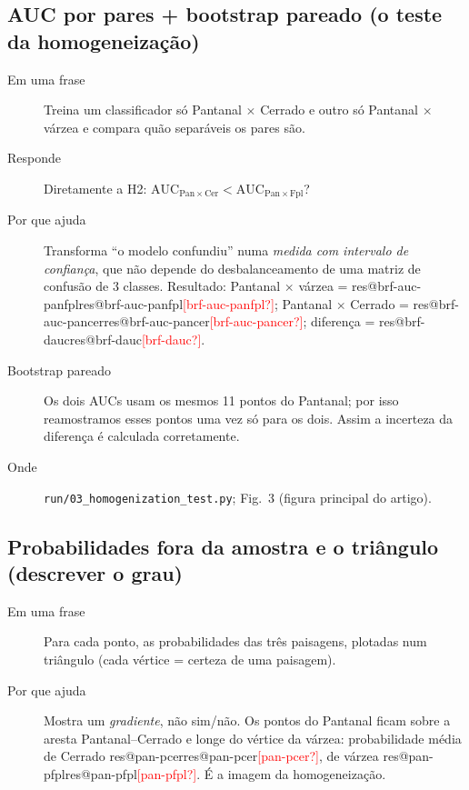 \documentclass[11pt,a4paper]{article}
\makeatletter
\newcommand{\res}[1]{\ifcsname res@#1\endcsname\csname res@#1\endcsname\else\textcolor{red}{[#1?]}\fi}
\makeatother
\begin{document}
\subsection{AUC por pares + bootstrap pareado (o teste da homogeneização)}
\begin{description}
\item[Em uma frase] Treina um classificador só Pantanal $\times$ Cerrado e outro só Pantanal
$\times$ várzea e compara quão separáveis os pares são.
\item[Responde] Diretamente a H2: $\mathrm{AUC}_{\mathrm{Pan}\times\mathrm{Cer}} <
\mathrm{AUC}_{\mathrm{Pan}\times\mathrm{Fpl}}$?
\item[Por que ajuda] Transforma ``o modelo confundiu'' numa \emph{medida com intervalo de
confiança}, que não depende do desbalanceamento de uma matriz de confusão de 3 classes. Resultado:
Pantanal $\times$ várzea = \res{brf-auc-panfpl}; Pantanal $\times$ Cerrado = \res{brf-auc-pancer};
diferença = \res{brf-dauc}.
\item[Bootstrap pareado] Os dois AUCs usam os mesmos 11 pontos do Pantanal; por isso reamostramos
esses pontos uma vez só para os dois. Assim a incerteza da diferença é calculada corretamente.
\item[Onde] \texttt{run/03\_homogenization\_test.py}; Fig.~3 (figura principal do artigo).
\end{description}

\subsection{Probabilidades fora da amostra e o triângulo (descrever o grau)}
\begin{description}
\item[Em uma frase] Para cada ponto, as probabilidades das três paisagens, plotadas num triângulo
(cada vértice = certeza de uma paisagem).
\item[Por que ajuda] Mostra um \emph{gradiente}, não sim/não. Os pontos do Pantanal ficam sobre a
aresta Pantanal--Cerrado e longe do vértice da várzea: probabilidade média de Cerrado
\res{pan-pcer}, de várzea \res{pan-pfpl}. É a imagem da homogeneização.
\end{description}
\end{document}

